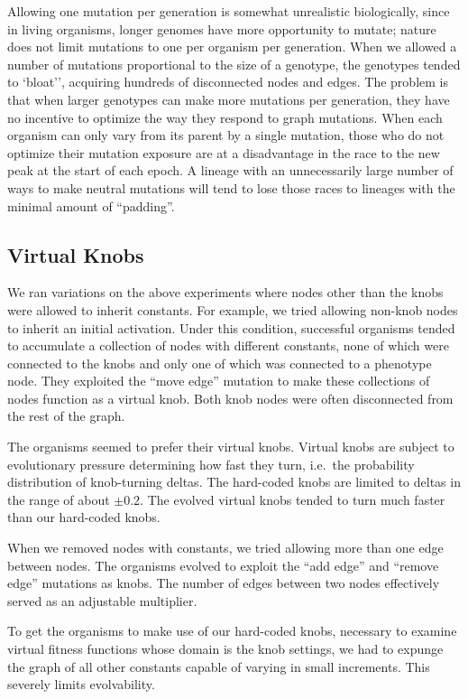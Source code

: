 \documentclass[letterpaper]{article}
\begin{document}
Allowing one mutation per generation is somewhat unrealistic biologically,
since in living organisms, longer genomes have more opportunity to mutate;
nature does not limit mutations to one per organism per generation. When we
allowed a number of mutations proportional to the size of a genotype, the
genotypes tended to `bloat'', acquiring hundreds of disconnected nodes and
edges. The problem is that when larger genotypes can make more mutations per
generation, they have no incentive to optimize the way they respond to graph
mutations.  When each organism can only vary from its parent by a single
mutation, those who do not optimize their mutation exposure are at a
disadvantage in the race to the new peak at the start of each epoch. A lineage
with an unnecessarily large number of ways to make neutral mutations will tend
to lose those races to lineages with the minimal amount of ``padding''.

\subsection{Virtual Knobs}

We ran variations on the above experiments where nodes other than the knobs were
allowed to inherit constants. For example, we tried allowing non-knob nodes to
inherit an initial activation. Under this condition, successful organisms tended
to accumulate a collection of nodes with different constants, none of which were
connected to the knobs and only one of which was connected to a phenotype node.
They exploited the ``move edge'' mutation to make these collections of nodes
function as a virtual knob. Both knob nodes were often disconnected from the
rest of the graph.

The organisms seemed to prefer their virtual knobs. Virtual knobs are subject to
evolutionary pressure determining how fast they turn, i.e.~the probability
distribution of knob-turning deltas. The hard-coded knobs are limited to deltas
in the range of about $\pm0.2$. The evolved virtual knobs tended to turn much
faster than our hard-coded knobs.

When we removed nodes with constants, we tried allowing more than one edge
between nodes. The organisms evolved to exploit the ``add edge'' and ``remove
edge'' mutations as knobs. The number of edges between two nodes effectively
served as an adjustable multiplier.

To get the organisms to make use of our hard-coded knobs, necessary to examine
virtual fitness functions whose domain is the knob settings, we had to expunge
the graph of all other constants capable of varying in small increments. This
severely limits evolvability.
\end{document}
